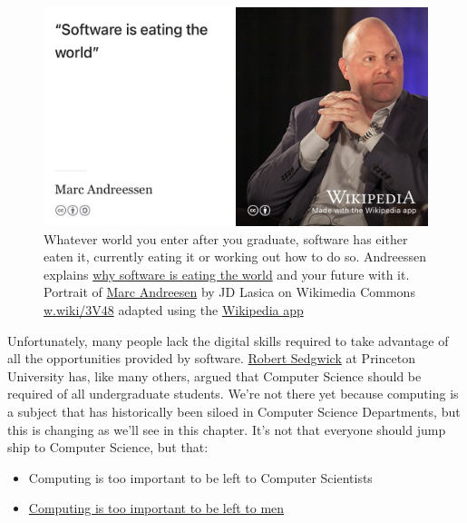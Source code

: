 \documentclass[
]{book}
\providecommand{\tightlist}{%
  \setlength{\itemsep}{0pt}\setlength{\parskip}{0pt}}
\begin{document}
\begin{figure}

{\centering \includegraphics[width=1\linewidth]{images/software-is-eating-the-world} 

}

\caption{Whatever world you enter after you graduate, software has either eaten it, currently eating it or working out how to do so. Andreessen explains \href{https://a16z.com/2011/08/20/why-software-is-eating-the-world/}{why software is eating the world} and your future with it. Portrait of \href{https://en.wikipedia.org/wiki/Marc_Andreessen}{Marc Andreesen} by JD Lasica on Wikimedia Commons \href{https://w.wiki/3V48}{w.wiki/3V48} adapted using the \href{https://apps.apple.com/gb/app/wikipedia/id324715238}{Wikipedia app}}\label{fig:eating-fig}
\end{figure}



Unfortunately, many people lack the digital skills required to take advantage of all the opportunities provided by software. \href{https://en.wikipedia.org/wiki/Robert_Sedgewick_(computer_scientist)}{Robert Sedgwick} at Princeton University has, like many others, argued that Computer Science should be required of all undergraduate students. \citep{robertsedgwick} We're not there yet because computing is a subject that has historically been siloed in Computer Science Departments, but this is changing as we'll see in this chapter. It's not that everyone should jump ship to Computer Science, but that:

\begin{itemize}
\tightlist
\item
  Computing is too important to be left to Computer Scientists
\item
  \href{https://www.bcs.org/content-hub/computings-too-important-to-be-left-to-men/}{Computing is too important to be left to men} \citep{sparckjones}
\end{itemize}
\end{document}
